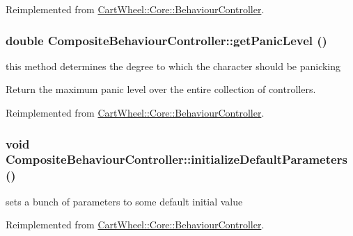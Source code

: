 Reimplemented from \hyperlink{classCartWheel_1_1Core_1_1BehaviourController_a26bfe1b24d791e35c78ce0dff3c7b274}{CartWheel::Core::BehaviourController}.

\hypertarget{classCartWheel_1_1Core_1_1CompositeBehaviourController_a103f9b905e00d730a3b07eedad8c491d}{
\subsubsection[{getPanicLevel}]{\setlength{\rightskip}{0pt plus 5cm}double CompositeBehaviourController::getPanicLevel ()}}
\label{classCartWheel_1_1Core_1_1CompositeBehaviourController_a103f9b905e00d730a3b07eedad8c491d}
this method determines the degree to which the character should be panicking

Return the maximum panic level over the entire collection of controllers. 

Reimplemented from \hyperlink{classCartWheel_1_1Core_1_1BehaviourController_aa8e43483e51a9cd697fa33a0674abccc}{CartWheel::Core::BehaviourController}.

\hypertarget{classCartWheel_1_1Core_1_1CompositeBehaviourController_a88c8eed10fb31f94b720e079348446bb}{
\subsubsection[{initializeDefaultParameters}]{\setlength{\rightskip}{0pt plus 5cm}void CompositeBehaviourController::initializeDefaultParameters ()}}
\label{classCartWheel_1_1Core_1_1CompositeBehaviourController_a88c8eed10fb31f94b720e079348446bb}
sets a bunch of parameters to some default initial value 

Reimplemented from \hyperlink{classCartWheel_1_1Core_1_1BehaviourController_a686bf6e2bc689fef41352eb1fc674884}{CartWheel::Core::BehaviourController}.

